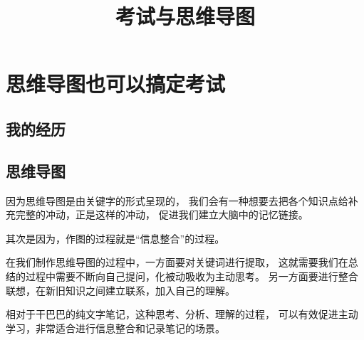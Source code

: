\documentclass[../main.tex]{subfiles}
\title{考试与思维导图}
\begin{document}
%
\maketitle
%
\section{思维导图也可以搞定考试}
%
\subsection{我的经历}
\begin{cuenotes}
\end{cuenotes}
%
\subsection{思维导图}
\begin{cuenotes}
\end{cuenotes}

因为思维导图是由关键字的形式呈现的，
我们会有一种想要去把各个知识点给补充完整的冲动，正是这样的冲动，
促进我们建立大脑中的记忆链接。

其次是因为，作图的过程就是``信息整合''的过程。

在我们制作思维导图的过程中，一方面要对关键词进行提取，
这就需要我们在总结的过程中需要不断向自己提问，化被动吸收为主动思考。
另一方面要进行整合联想，在新旧知识之间建立联系，加入自己的理解。

相对于干巴巴的纯文字笔记，这种思考、分析、理解的过程，
可以有效促进主动学习，非常适合进行信息整合和记录笔记的场景。
%
\end{document}
